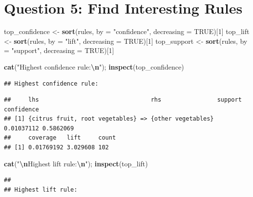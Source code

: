 \documentclass[
]{article}
\newenvironment{Shaded}{\begin{snugshade}}{\end{snugshade}}
\newcommand{\AttributeTok}[1]{\textcolor[rgb]{0.13,0.29,0.53}{#1}}
\newcommand{\ConstantTok}[1]{\textcolor[rgb]{0.56,0.35,0.01}{#1}}
\newcommand{\DecValTok}[1]{\textcolor[rgb]{0.00,0.00,0.81}{#1}}
\newcommand{\FunctionTok}[1]{\textcolor[rgb]{0.13,0.29,0.53}{\textbf{#1}}}
\newcommand{\NormalTok}[1]{#1}
\newcommand{\OtherTok}[1]{\textcolor[rgb]{0.56,0.35,0.01}{#1}}
\newcommand{\SpecialCharTok}[1]{\textcolor[rgb]{0.81,0.36,0.00}{\textbf{#1}}}
\newcommand{\StringTok}[1]{\textcolor[rgb]{0.31,0.60,0.02}{#1}}
\begin{document}
\section{Question 5: Find Interesting
Rules}\label{question-5-find-interesting-rules}

\begin{Shaded}
\begin{Highlighting}[]
\NormalTok{top\_confidence }\OtherTok{\textless{}{-}} \FunctionTok{sort}\NormalTok{(rules, }\AttributeTok{by =} \StringTok{"confidence"}\NormalTok{, }\AttributeTok{decreasing =} \ConstantTok{TRUE}\NormalTok{)[}\DecValTok{1}\NormalTok{]}
\NormalTok{top\_lift       }\OtherTok{\textless{}{-}} \FunctionTok{sort}\NormalTok{(rules, }\AttributeTok{by =} \StringTok{"lift"}\NormalTok{,       }\AttributeTok{decreasing =} \ConstantTok{TRUE}\NormalTok{)[}\DecValTok{1}\NormalTok{]}
\NormalTok{top\_support    }\OtherTok{\textless{}{-}} \FunctionTok{sort}\NormalTok{(rules, }\AttributeTok{by =} \StringTok{"support"}\NormalTok{,    }\AttributeTok{decreasing =} \ConstantTok{TRUE}\NormalTok{)[}\DecValTok{1}\NormalTok{]}

\FunctionTok{cat}\NormalTok{(}\StringTok{"Highest confidence rule:}\SpecialCharTok{\textbackslash{}n}\StringTok{"}\NormalTok{); }\FunctionTok{inspect}\NormalTok{(top\_confidence)}
\end{Highlighting}
\end{Shaded}

\begin{verbatim}
## Highest confidence rule:
\end{verbatim}

\begin{verbatim}
##     lhs                                rhs                support    confidence
## [1] {citrus fruit, root vegetables} => {other vegetables} 0.01037112 0.5862069 
##     coverage   lift     count
## [1] 0.01769192 3.029608 102
\end{verbatim}

\begin{Shaded}
\begin{Highlighting}[]
\FunctionTok{cat}\NormalTok{(}\StringTok{"}\SpecialCharTok{\textbackslash{}n}\StringTok{Highest lift rule:}\SpecialCharTok{\textbackslash{}n}\StringTok{"}\NormalTok{);     }\FunctionTok{inspect}\NormalTok{(top\_lift)}
\end{Highlighting}
\end{Shaded}

\begin{verbatim}
## 
## Highest lift rule:
\end{verbatim}
\end{document}
